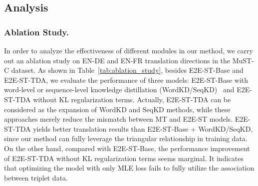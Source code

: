 \documentclass[letterpaper]{article} %
\begin{document}
\begin{table}[t]
    \small
    \normalsize
    \centering
    \caption{BLEU and WER scores of ablation study on MuST-C tst-COMMON set. ``w/o" means without.}
    \label{tab:ablation_study}
\end{table}


\subsection{Analysis}
\subsubsection*{Ablation Study.}

In order to analyze the effectiveness of different modules in our method, we carry out an ablation study on EN-DE and EN-FR translation directions in the MuST-C dataset.
As shown in Table~\ref{tab:ablation_study}, besides E2E-ST-Base and E2E-ST-TDA, we evaluate the performance of three models: E2E-ST-Base with word-level or sequence-level knowledge distillation (WordKD/SeqKD)~\cite{Kim2016SequenceLevelKD} and E2E-ST-TDA without KL regularization terms.
Actually, E2E-ST-TDA can be considered as the expansion of WordKD and SeqKD methods, while these approaches merely reduce the mismatch between MT and E2E-ST models.
E2E-ST-TDA yields better translation results than E2E-ST-Base + WordKD/SeqKD, since our method can fully leverage the triangular relationship in training data.
On the other hand, compared with E2E-ST-Base, the performance improvement of E2E-ST-TDA without KL regularization terms seems marginal.
It indicates that optimizing the model with only MLE loss fails to fully utilize the association between triplet data.
\end{document}
